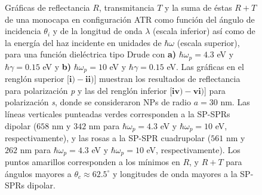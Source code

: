 \begin{figure}[h!]
\begin{subfigure}{.7\linewidth}
		\end{subfigure}\vspace*{-.5em}
	\caption{Gráficas de reflectancia $R$, transmitancia $T$ y la suma de éstas $R+T$ de una monocapa en configuración ATR como función del ángulo de incidencia $\theta_i$ y de la longitud de onda $\lambda$ (escala inferior) así como de la energía del haz incidente en unidades de $\hbar\omega$ (escala superior), para una función dieléctrica tipo Drude con \textbf{a)} $\hbar\omega_p=4. 3$ eV  y  $\hbar\gamma=0. 15$ eV y \textbf{b)} $\hbar\omega_p = 10$ eV y $\hbar\gamma = 0.15$ eV.  Las gráficas   en el renglón superior [$\mathbf{i)-ii)}$]  muestran los resultados de reflectancia para  polarización \emph{p} y las del renglón inferior  [$\mathbf{iv)-vi)}$] para polarización  \emph{s}, donde se consideraron NPs de radio $a=30$ nm. Las líneas verticales punteadas verdes corresponden a la SP-SPRs dipolar ($658$ nm y $342$ nm para $\hbar\omega_p=4.3$ eV y $\hbar\omega_p = 10$ eV, respectivamente), y las rosas a la SP-SPR cuadrupolar ($561$ nm y $262$ nm para $\hbar\omega_p=4.3$ eV y $\hbar\omega_p = 10$ eV, respectivamente). Los puntos amarillos corresponden a los mínimos en $R$, y $R+T$ para ángulos mayores a $\theta_c\approx 62.5^\circ$ y longitudes de onda mayores a la SP-SPRs dipolar. }\label{fig:RT-Omegas}
	\end{figure}	

